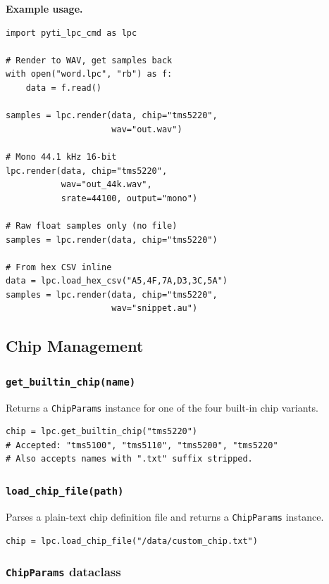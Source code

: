 \documentclass[10pt]{article}
\begin{document}
\medskip\noindent\textbf{Example usage.}\par\vspace{4pt}
\begin{lstlisting}[caption={Common render() patterns}]
import pyti_lpc_cmd as lpc

# Render to WAV, get samples back
with open("word.lpc", "rb") as f:
    data = f.read()

samples = lpc.render(data, chip="tms5220",
                     wav="out.wav")

# Mono 44.1 kHz 16-bit
lpc.render(data, chip="tms5220",
           wav="out_44k.wav",
           srate=44100, output="mono")

# Raw float samples only (no file)
samples = lpc.render(data, chip="tms5220")

# From hex CSV inline
data = lpc.load_hex_csv("A5,4F,7A,D3,3C,5A")
samples = lpc.render(data, chip="tms5220",
                     wav="snippet.au")
\end{lstlisting}

\subsection{Chip Management}

\subsubsection{\texttt{get\_builtin\_chip(name)}}

Returns a \texttt{ChipParams} instance for one of the four built-in chip
variants.

\begin{lstlisting}
chip = lpc.get_builtin_chip("tms5220")
# Accepted: "tms5100", "tms5110", "tms5200", "tms5220"
# Also accepts names with ".txt" suffix stripped.
\end{lstlisting}

\subsubsection{\texttt{load\_chip\_file(path)}}

Parses a plain-text chip definition file and returns a \texttt{ChipParams}
instance.

\begin{lstlisting}
chip = lpc.load_chip_file("/data/custom_chip.txt")
\end{lstlisting}

\subsubsection{\texttt{ChipParams} dataclass}
\end{document}
